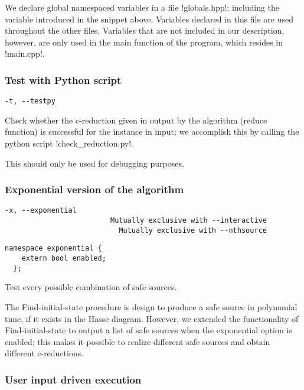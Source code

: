 We declare global namespaced variables in a file !globals.hpp!; including the variable introduced in the snippet above.
Variables declared in this file are used throughout the other files. Variables that are not included in our description, however, are only used in the main function of the program, which resides in !main.cpp!.

\subsubsection*{Test with Python script}

\begin{lstlisting}[aboveskip=\smallskipamount]
  -t, --testpy
\end{lstlisting}

Check whether the c-reduction given in output by the algorithm (reduce function) is successful for the instance in input; we accomplish this by calling the python script !check_reduction.py!.

This should only be used for debugging purposes.

\subsubsection*{Exponential version of the algorithm}

\begin{lstlisting}[aboveskip=\smallskipamount]
  -x, --exponential
                         Mutually exclusive with --interactive
                           Mutually exclusive with --nthsource
\end{lstlisting}

\begin{lstlisting}[style=c++_block, aboveskip=\smallskipamount]
  namespace exponential {
    extern bool enabled;
  };
\end{lstlisting}

Test every possible combination of safe sources.

The Find-initial-state procedure is design to produce a safe source in polynomial time, if it exists in the Hasse diagram.
However, we extended the functionality of Find-initial-state to output a list of safe sources when the exponential option is enabled; this makes it possible to realize different safe sources and obtain different c-reductions.

\subsubsection*{User input driven execution}


